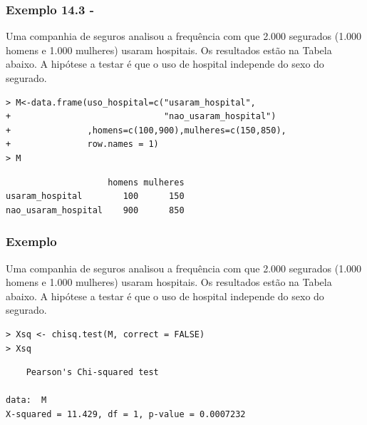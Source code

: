 \documentclass[14pt,aspectratio=1610]{beamer}
\begin{document}
\begin{frame}[fragile]{}
\frametitle{Exemplo 14.3 - \cite{Morettin09}}
\begin{block}{}
\justifying
Uma companhia de seguros analisou a frequência com que 2.000 segurados (1.000 homens e 1.000 mulheres) usaram hospitais. Os resultados estão na Tabela abaixo. A hipótese a testar é que o uso de hospital independe do sexo do segurado.
\begin{verbatim}
> M<-data.frame(uso_hospital=c("usaram_hospital", 
+                              "nao_usaram_hospital")
+               ,homens=c(100,900),mulheres=c(150,850), 
+               row.names = 1)
> M    
\end{verbatim}

\begin{verbatim}
                    homens mulheres
usaram_hospital        100      150
nao_usaram_hospital    900      850    
\end{verbatim}

\end{block}
\end{frame}

\begin{frame}[fragile]{}
\frametitle{Exemplo}
\begin{block}{}
\justifying
Uma companhia de seguros analisou a frequência com que 2.000 segurados (1.000 homens e 1.000 mulheres) usaram hospitais. Os resultados estão na Tabela abaixo. A hipótese a testar é que o uso de hospital independe do sexo do segurado.
\begin{verbatim}
> Xsq <- chisq.test(M, correct = FALSE)
> Xsq    
\end{verbatim}

\begin{verbatim}
	Pearson's Chi-squared test

data:  M
X-squared = 11.429, df = 1, p-value = 0.0007232    
\end{verbatim}

\end{block}
\end{frame}
\end{document}
